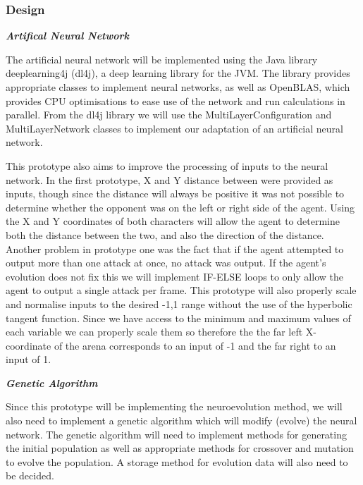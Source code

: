 \documentclass[12pt,a4paper]{article}
\begin{document}
\begin{figure}[h]
\end{figure}
\subsubsection{Design}

\textbf{\textit{Artifical Neural Network}}

\vspace{3mm}

The artificial neural network will be implemented using the Java library deeplearning4j (dl4j), a deep learning library for the JVM. The library provides appropriate classes to implement neural networks, as well as OpenBLAS, which provides CPU optimisations to ease use of the network and run calculations in parallel. From the dl4j library we will use the MultiLayerConfiguration and MultiLayerNetwork classes to implement our adaptation of an artificial neural network.

\newpage
This prototype also aims to improve the processing of inputs to the neural network. In the first prototype, X and Y distance between were provided as inputs, though since the distance will always be positive it was not possible to determine whether the opponent was on the left or right side of the agent. Using the X and Y coordinates of both characters will allow the agent to determine both the distance between the two, and also the direction of the distance. Another problem in prototype one was the fact that if the agent attempted to output more than one attack at once, no attack was output. If the agent's evolution does not fix this we will implement IF-ELSE loops to only allow the agent to output a single attack per frame. This prototype will also properly scale and normalise inputs to the desired -1,1 range without the use of the hyperbolic tangent function. Since we have access to the minimum and maximum values of each variable we can properly scale them so therefore the the far left X-coordinate of the arena corresponds to an input of -1 and the far right to an input of 1.

\vspace{5mm}

\textbf{\textit{Genetic Algorithm}}

\vspace{3mm}

Since this prototype will be implementing the neuroevolution method, we will also need to implement a genetic algorithm which will modify (evolve) the neural network. The genetic algorithm will need to implement methods for generating the initial population as well as appropriate methods for crossover and mutation to evolve the population. A storage method for evolution data will also need to be decided.
\end{document}
